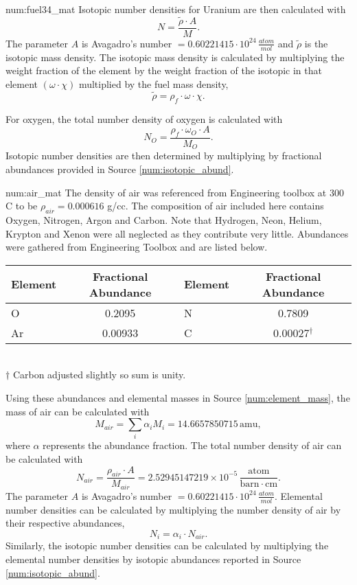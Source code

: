 \begin{numitem}{num:fuel34_mat}
Isotopic number densities for Uranium are then calculated with
\[
    N = \frac{\widetilde{\rho} \cdot A}{M}.
\]
The parameter $A$ is Avagadro's number $=0.60221415\cdot 10^{24}\,\frac{atom}{mol}$ and $\widetilde{\rho}$ is the isotopic mass density. The isotopic mass density is calculated by multiplying the weight fraction of the element by the weight fraction of the isotopic in that element $\left(\omega\cdot\chi\right)$ multiplied by the fuel mass density,
\[
  \widetilde{\rho} = \rho_f\cdot \omega \cdot \chi.
\]

For oxygen, the total number density of oxygen is calculated with
\[
    N_O = \frac{\rho_f \cdot \omega_O \cdot A}{M_O}.
\]
Isotopic number densities are then determined by multiplying by fractional abundances provided in Source \ref{num:isotopic_abund}.


\end{numitem}

\begin{numitem}{num:air_mat}
   The density of air was referenced from Engineering toolbox at 300 C to be $\rho_{air} = 0.000616$ g/cc.  The composition of air included here contains Oxygen, Nitrogen, Argon and Carbon. Note that Hydrogen, Neon, Helium, Krypton and Xenon were all neglected as they contribute very little. Abundances were gathered from Engineering Toolbox and are listed below.
 \begin{center}
  \begin{tabular}{l c l c}
    \toprule
    Element & Fractional Abundance & Element & Fractional Abundance \\
    \midrule
    \midrule
 O   &  0.2095  &  N  &   0.7809 \\
Ar   &  0.00933 &  C  &   0.00027$^\dagger$   \\
    \bottomrule
  \end{tabular}
   \\ $\dagger$ \footnotesize{Carbon adjusted slightly so sum is unity.}
 \end{center}
 
    Using these abundances and elemental masses in Source \ref{num:element_mass}, the mass of air can be calculated with
\[
    M_{air} = \sum_i \alpha_i M_i = 14.6657850715\,\mathrm{amu},
\]
where $\alpha$ represents the abundance fraction. The total number density of air can be calculated with
\[
    N_{air} = \frac{\rho_{air} \cdot A}{M_{air}} =  2.52945147219\times 10^{-5}\,\mathrm{\frac{atom}{barn\cdot cm}}.
\]
The parameter $A$ is Avagadro's number $=0.60221415\cdot 10^{24}\,\frac{atom}{mol}$.
Elemental number densities can be calculated by multiplying the number density of air by their respective abundances,
\[
    N_i = \alpha_i \cdot N_{air}.
\]
Similarly, the isotopic number densities can be calculated by multiplying the elemental number densities by isotopic abundances reported in Source \ref{num:isotopic_abund}.


\end{numitem}

